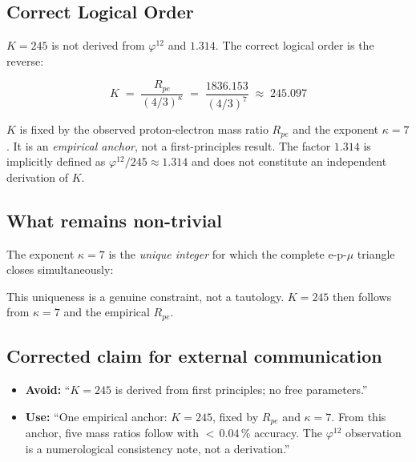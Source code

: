 \subsection*{Correct Logical Order}

$K = 245$ is not derived from $\varphi^{12}$ and $1.314$.
The correct logical order is the reverse:

\begin{equation}
  K \;=\; \frac{R_{pe}}{(4/3)^\kappa}
    \;=\; \frac{1836.153}{(4/3)^7}
    \;\approx\; 245.097
  \tag{190.14}
\end{equation}

$K$ is fixed by the observed proton-electron mass ratio $R_{pe}$ and
the exponent $\kappa = 7$. It is an \emph{empirical anchor}, not a
first-principles result. The factor $1.314$ is implicitly defined as
$\varphi^{12} / 245 \approx 1.314$ and does not constitute an
independent derivation of $K$.

\subsection*{What remains non-trivial}

The exponent $\kappa = 7$ is the \emph{unique integer} for which the
complete e-p-$\mu$ triangle closes simultaneously:
\begin{center}
{\footnotesize
{}
}
\end{center}
This uniqueness is a genuine constraint, not a tautology.
$K = 245$ then follows from $\kappa = 7$ and the empirical $R_{pe}$.

\subsection*{Corrected claim for external communication}

\begin{itemize}
  \item \textbf{Avoid:} \enquote{$K = 245$ is derived from first
        principles; no free parameters.}
  \item \textbf{Use:} \enquote{One empirical anchor: $K = 245$,
        fixed by $R_{pe}$ and $\kappa = 7$. From this anchor,
        five mass ratios follow with ${<}\,0.04\,\%$ accuracy.
        The $\varphi^{12}$ observation is a numerological
        consistency note, not a derivation.}
\end{itemize}

